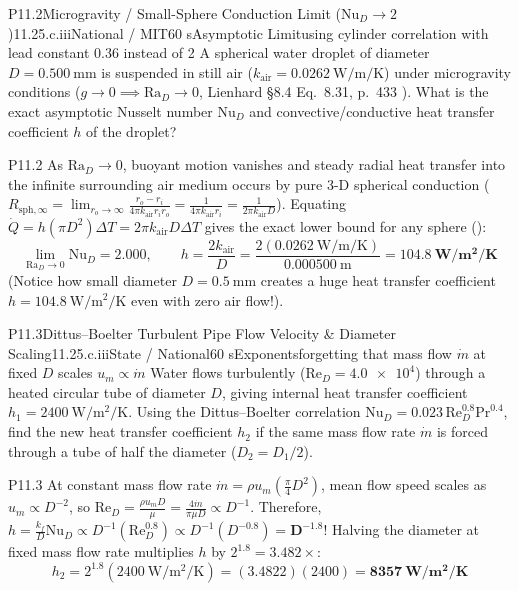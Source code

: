 \begin{problem}{P11.2}{Microgravity / Small-Sphere Conduction Limit ($\mathrm{Nu}_D \to 2$)}{11.2}{5.c.iii}{National / MIT}{60 s}{Asymptotic Limit}{using cylinder correlation with lead constant 0.36 instead of 2}
A spherical water droplet of diameter $D = \SI{0.500}{\milli\meter}$ is suspended in still air ($k_{\mathrm{air}} = \SI{0.0262}{\watt\per\meter\per\kelvin}$) under microgravity conditions ($g \to 0 \implies \mathrm{Ra}_D \to 0$, Lienhard §8.4 Eq.~8.31, p.~433 ). What is the exact asymptotic Nusselt number $\mathrm{Nu}_D$ and convective/conductive heat transfer coefficient $h$ of the droplet?
\end{problem}
\begin{solution}{P11.2}
As $\mathrm{Ra}_D \to 0$, buoyant motion vanishes and steady radial heat transfer into the infinite surrounding air medium occurs by pure 3-D spherical conduction ($R_{\mathrm{sph},\infty} = \lim_{r_o\to\infty}\frac{r_o - r_i}{4\pi k_{\mathrm{air}}r_i r_o} = \frac{1}{4\pi k_{\mathrm{air}}r_i} = \frac{1}{2\pi k_{\mathrm{air}}D}$). Equating $\dot{Q} = h(\pi D^2)\Delta T = 2\pi k_{\mathrm{air}}D\Delta T$ gives the exact lower bound for any sphere ():
\[
  \lim_{\mathrm{Ra}_D \to 0} \mathrm{Nu}_D = \mathbf{2.000}, \qquad h = \frac{2 k_{\mathrm{air}}}{D} = \frac{2(\SI{0.0262}{\watt\per\meter\per\kelvin})}{\SI{0.000500}{\meter}} = \mathbf{\SI{104.8}{\watt\per\square\meter\per\kelvin}}
\]
(Notice how small diameter $D = \SI{0.5}{\milli\meter}$ creates a huge heat transfer coefficient $h = \SI{104.8}{\watt\per\square\meter\per\kelvin}$ even with zero air flow!).
\end{solution}

\begin{problem}{P11.3}{Dittus--Boelter Turbulent Pipe Flow Velocity \& Diameter Scaling}{11.2}{5.c.iii}{State / National}{60 s}{Exponents}{forgetting that mass flow $\dot{m}$ at fixed $D$ scales $u_m \propto \dot{m}$}
Water flows turbulently ($\mathrm{Re}_D = \num{4.0e4}$) through a heated circular tube of diameter $D$, giving internal heat transfer coefficient $h_1 = \SI{2400}{\watt\per\square\meter\per\kelvin}$. Using the Dittus--Boelter correlation $\mathrm{Nu}_D = 0.023\,\mathrm{Re}_D^{0.8}\mathrm{Pr}^{0.4}$, find the new heat transfer coefficient $h_2$ if the same mass flow rate $\dot{m}$ is forced through a tube of half the diameter ($D_2 = D_1 / 2$).
\end{problem}
\begin{solution}{P11.3}
At constant mass flow rate $\dot{m} = \rho u_m (\frac{\pi}{4}D^2)$, mean flow speed scales as $u_m \propto D^{-2}$, so $\mathrm{Re}_D = \frac{\rho u_m D}{\mu} = \frac{4\dot{m}}{\pi\mu D} \propto D^{-1}$. Therefore, $h = \frac{k_f}{D}\mathrm{Nu}_D \propto D^{-1}\left(\mathrm{Re}_D^{0.8}\right) \propto D^{-1}\left(D^{-0.8}\right) = \mathbf{D^{-1.8}}$! Halving the diameter at fixed mass flow rate multiplies $h$ by $2^{1.8} = \mathbf{3.482\times}$:
\[
  h_2 = 2^{1.8}(\SI{2400}{\watt\per\square\meter\per\kelvin}) = (3.4822)(2400) = \mathbf{\SI{8357}{\watt\per\square\meter\per\kelvin}}
\]
\end{solution}

